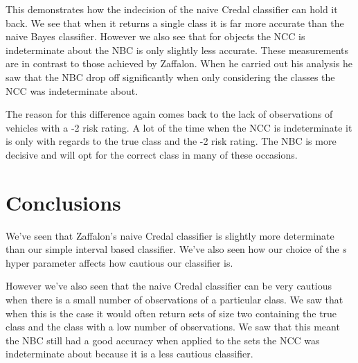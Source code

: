 This demonstrates how the indecision of the naive Credal classifier can hold it back.
We see that when it returns a single class it is far more accurate than the naive Bayes classifier.
However we also see that for objects the NCC is indeterminate about the NBC is only slightly less accurate.
These measurements are in contrast to those achieved by Zaffalon.
When he carried out his analysis he saw that the NBC drop off significantly when only considering the classes the NCC was indeterminate about.

The reason for this difference again comes back to the lack of observations of vehicles with a -2 risk rating.
A lot of the time when the NCC is indeterminate it is only with regards to the true class and the -2 risk rating.
The NBC is more decisive and will opt for the correct class in many of these occasions.

\section{Conclusions}

We've seen that Zaffalon's naive Credal classifier is slightly more determinate than our simple interval based classifier.
We've also seen how our choice of the $s$ hyper parameter affects how cautious our classifier is.

However we've also seen that the naive Credal classifier can be very cautious when there is a small number of observations of a particular class.
We saw that when this is the case it would often return sets of size two containing the true class and the class with a low number of observations.
We saw that this meant the NBC still had a good accuracy when applied to the sets the NCC was indeterminate about because it is a less cautious classifier.